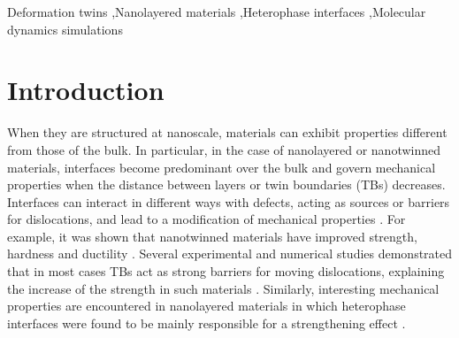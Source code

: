 \documentclass[final,3p,times,twocolumn]{elsarticle}
\begin{document}
\begin{frontmatter}
\begin{abstract}
\end{abstract}

\begin{keyword}

Deformation twins \sep Nanolayered materials \sep Heterophase interfaces \sep Molecular dynamics simulations




\end{keyword}

\end{frontmatter}


\section{Introduction}

When they are structured at nanoscale, materials can exhibit properties different from those of the bulk. In particular, in the case of nanolayered or nanotwinned materials, interfaces become predominant over the bulk and govern mechanical properties when the distance between layers or twin boundaries (TBs) decreases. Interfaces can interact in different ways with defects, acting as sources or barriers for dislocations, and lead to a modification of mechanical properties \cite{beyerlein15PMS}. For example, it was shown that nanotwinned materials have improved strength, hardness and ductility \cite{lu04S,lu09S,stukowski10PRB,sansoz07NL}. Several experimental and numerical studies demonstrated that in most cases TBs act as strong barriers for moving dislocations, explaining the increase of the strength in such materials \cite{wu09AM,deng09NL,cao15SM}. Similarly, interesting mechanical properties are encountered in nanolayered materials in which heterophase interfaces were found to be mainly responsible for a strengthening effect \cite{misra01AEM,misra05AM}.
\end{document}
